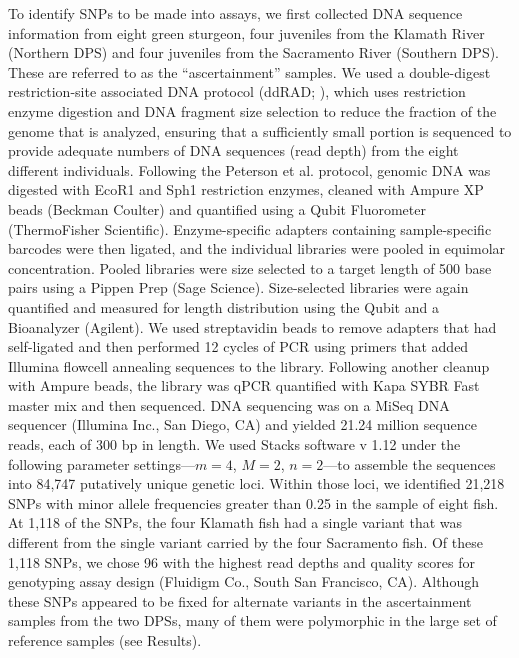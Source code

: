 To identify SNPs to be made into assays, we first collected DNA sequence
information from eight green sturgeon, four juveniles from the Klamath River 
(Northern DPS) and four juveniles from the Sacramento River (Southern DPS). 
These are referred to as the ``ascertainment'' samples. We used a double-digest restriction-site associated
DNA protocol (ddRAD; \citealt{Petersonetal2012}), which uses restriction
enzyme digestion and DNA fragment size selection to reduce the fraction of the
genome that is analyzed, ensuring that a sufficiently small portion is
sequenced to provide adequate numbers of DNA sequences (read depth) from the
eight different individuals. 
Following the Peterson et al. protocol, genomic DNA was digested with EcoR1 and Sph1
restriction enzymes, cleaned with Ampure XP beads (Beckman Coulter) and quantified
using a Qubit Fluorometer (ThermoFisher Scientific). Enzyme-specific adapters
containing sample-specific barcodes were then ligated, and the individual libraries
were pooled in equimolar concentration. Pooled libraries were size selected to a target
length of 500 base pairs using a Pippen Prep (Sage Science). Size-selected
libraries were again quantified and measured for length distribution using the
Qubit and a Bioanalyzer (Agilent). We used streptavidin beads to remove adapters
that had self-ligated and then performed 12 cycles of PCR using primers that
added Illumina flowcell annealing sequences to the library. Following another cleanup
with Ampure beads, the library was qPCR quantified with Kapa SYBR Fast master mix and
then sequenced. DNA sequencing was on a MiSeq DNA sequencer 
(Illumina Inc., San Diego, CA) and yielded 21.24 million sequence reads, 
each of 300 bp in length. We used Stacks software v 1.12 \citep{catchen2011stacks} 
under the following parameter settings---$m = 4$, $M = 2$, $n = 2$---to assemble 
the sequences into 84,747 putatively unique genetic loci. Within those loci, 
we identified 21,218 SNPs with minor allele frequencies greater than 0.25 
in the sample of eight fish. At 1,118 of the SNPs, the four Klamath fish 
had a single variant that was different from the single variant carried by 
the four Sacramento fish. Of these 1,118 SNPs, we chose 96 with the highest 
read depths and quality scores for \snptype{} genotyping assay design 
(Fluidigm Co., South San Francisco, CA). Although these SNPs appeared
to be fixed for alternate variants in the ascertainment samples from the 
two DPSs, many of them were polymorphic in the large set of reference samples (see Results).

